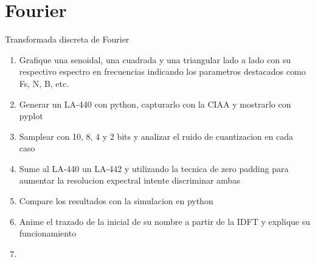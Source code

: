  \section{Fourier}
 \begin{frame}{Transformada discreta de Fourier}
    \begin{enumerate}
       \item{Grafique una senoidal, una cuadrada y una triangular lado a lado con su respectivo espectro en frecuencias indicando los parametros destacados como Fs, N, B, etc.} 
       \item{Generar un LA-440 con python, capturarlo con la CIAA y mostrarlo con pyplot}
       \item{Samplear con 10, 8, 4 y 2 bits y analizar el ruido de cuantizacion en cada caso}
       \item{Sume al LA-440 un LA-442 y utilizando la tecnica de zero padding para aumentar la resolucion expectral intente discriminar ambas}
       \item{Compare los resultados con la simulacion en python}
       \item{Anime el trazado de la inicial de su nombre a partir de la IDFT y explique su funcionamiento}
       \item{}
    \end{enumerate}
 \end{frame}
